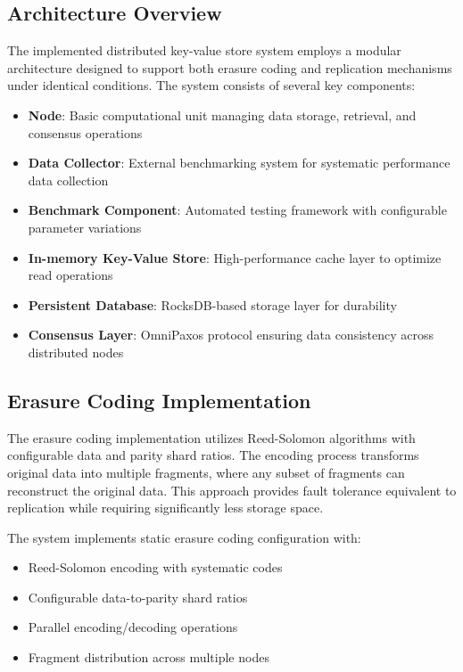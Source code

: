 \subsection{Architecture Overview}

The implemented distributed key-value store system employs a modular architecture designed to support both erasure coding and replication mechanisms under identical conditions. The system consists of several key components:

\begin{itemize}
\item \textbf{Node}: Basic computational unit managing data storage, retrieval, and consensus operations
\item \textbf{Data Collector}: External benchmarking system for systematic performance data collection
\item \textbf{Benchmark Component}: Automated testing framework with configurable parameter variations
\item \textbf{In-memory Key-Value Store}: High-performance cache layer to optimize read operations
\item \textbf{Persistent Database}: RocksDB-based storage layer for durability
\item \textbf{Consensus Layer}: OmniPaxos protocol ensuring data consistency across distributed nodes
\end{itemize}

\subsection{Erasure Coding Implementation}

The erasure coding implementation utilizes Reed-Solomon algorithms with configurable data and parity shard ratios. The encoding process transforms original data into multiple fragments, where any subset of fragments can reconstruct the original data. This approach provides fault tolerance equivalent to replication while requiring significantly less storage space.

The system implements static erasure coding configuration with:
\begin{itemize}
\item Reed-Solomon encoding with systematic codes
\item Configurable data-to-parity shard ratios
\item Parallel encoding/decoding operations
\item Fragment distribution across multiple nodes
\end{itemize}

